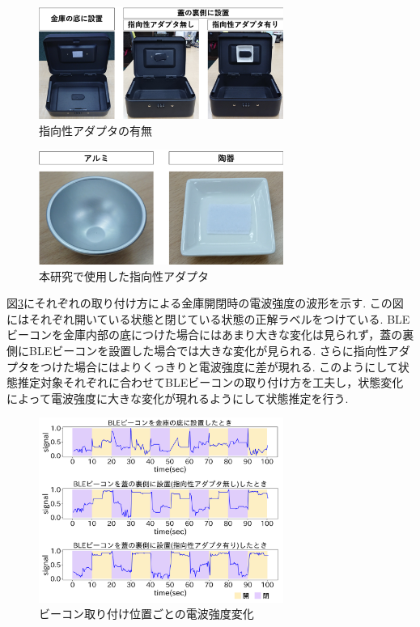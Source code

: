\documentclass[Japanese]{dicomopapers}
\begin{document}
\begin{figure}[tbh]
    \centering
    \includegraphics[width=8cm]{adapta_compare2.png}
    \caption{指向性アダプタの有無}
    \label{adapter}
\end{figure}

\begin{figure}[tbh]
    \centering
    \includegraphics[width=8cm]{adapta.png}
    \caption{本研究で使用した指向性アダプタ}
    \label{adapter_only}
\end{figure}

図\ref{transform-data}にそれぞれの取り付け方による金庫開閉時の電波強度の波形を示す.
この図にはそれぞれ開いている状態と閉じている状態の正解ラベルをつけている.
BLEビーコンを金庫内部の底につけた場合にはあまり大きな変化は見られず，蓋の裏側にBLEビーコンを設置した場合では大きな変化が見られる.
さらに指向性アダプタをつけた場合にはよりくっきりと電波強度に差が現れる.
このようにして状態推定対象それぞれに合わせてBLEビーコンの取り付け方を工夫し，状態変化によって電波強度に大きな変化が現れるようにして状態推定を行う.


\begin{figure}[tbh]
    \centering
    \includegraphics[width=8cm]{in-out.png}
    \caption{ビーコン取り付け位置ごとの電波強度変化}
    \label{transform-data}
\end{figure}
\end{document}
